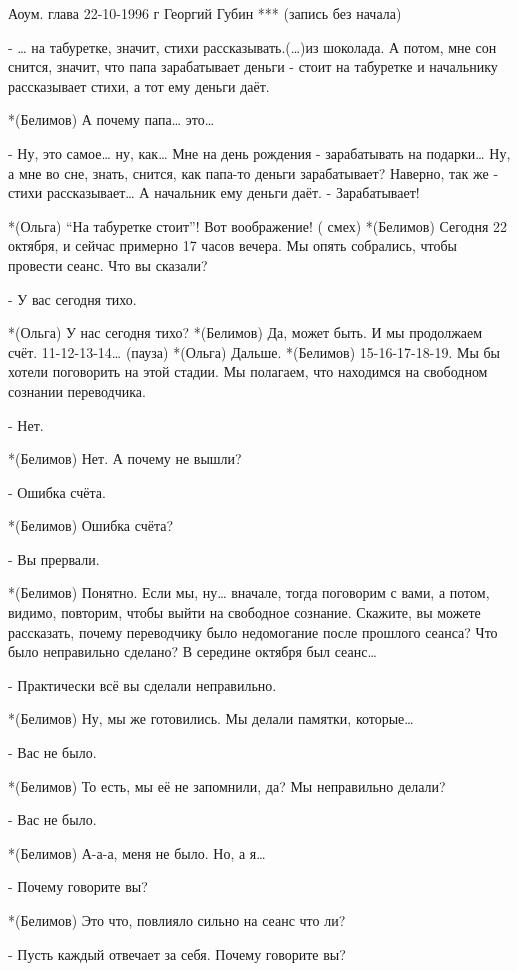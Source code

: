 Аоум. глава 22-10-1996 г
Георгий Губин
***
(запись без начала)

- … на табуретке, значит, стихи рассказывать.(…)из шоколада. А потом, мне сон снится, значит, что папа зарабатывает деньги - стоит на табуретке и начальнику рассказывает стихи, а тот ему деньги даёт.

*(Белимов) А почему папа… это…

- Ну, это самое… ну, как… Мне на день рождения - зарабатывать на подарки… Ну, а мне во сне, знать, снится, как папа-то  деньги зарабатывает? Наверно, так же - стихи рассказывает… А начальник ему деньги даёт. - Зарабатывает!  



*(Ольга) “На табуретке стоит”! Вот воображение! ( смех)
*(Белимов) Сегодня 22 октября, и сейчас примерно 17 часов вечера. Мы опять собрались, чтобы провести сеанс. 
Что вы сказали?

- У вас сегодня тихо.

*(Ольга) У нас сегодня тихо?
*(Белимов) Да, может быть. И мы продолжаем счёт. 11-12-13-14… (пауза)
*(Ольга) Дальше.
*(Белимов) 15-16-17-18-19. Мы бы хотели поговорить на этой стадии. Мы полагаем, что находимся на свободном сознании переводчика.

- Нет.

*(Белимов) Нет. А почему не вышли?

- Ошибка счёта.

*(Белимов) Ошибка счёта?

- Вы прервали.

*(Белимов) Понятно. Если мы, ну… вначале, тогда поговорим с вами, а потом, видимо, повторим, чтобы выйти на свободное сознание. Скажите, вы можете рассказать, почему переводчику было недомогание после прошлого сеанса? Что было неправильно сделано? В середине октября был сеанс…

- Практически всё вы сделали неправильно.

*(Белимов) Ну, мы же готовились. Мы делали памятки, которые…

- Вас не было.

*(Белимов) То есть, мы её не запомнили, да? Мы неправильно делали?

- Вас не было.

*(Белимов) А-а-а, меня не было. Но, а я…

- Почему говорите вы?

*(Белимов) Это что, повлияло сильно на сеанс что ли?

- Пусть каждый отвечает за себя. Почему говорите вы?


